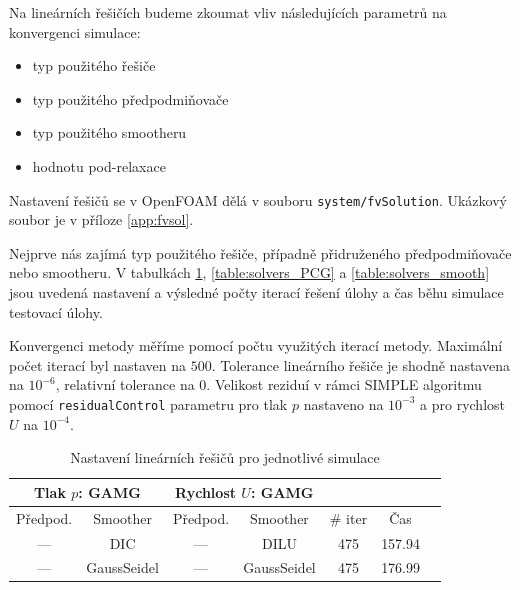 \documentclass[a4paper,12pt]{report}
\theoremstyle{remark}
\begin{document}
Na lineárních řešičích budeme zkoumat vliv následujících parametrů na konvergenci simulace:
 
\begin{itemize}
	\item typ použitého řešiče
	\item typ použitého předpodmiňovače
	\item typ použitého smootheru
	\item hodnotu pod-relaxace
\end{itemize}

Nastavení řešičů se v OpenFOAM dělá v souboru \texttt{system/fvSolution}. Ukázkový soubor je v příloze \ref{app:fvsol}.
	
 Nejprve nás zajímá typ použitého řešiče, případně přidruženého předpodmiňovače nebo smootheru. V tabulkách \ref{table:solvers_GAMG}, \ref{table:solvers_PCG} a \ref{table:solvers_smooth} jsou uvedená nastavení a výsledné počty iterací řešení úlohy a čas běhu simulace testovací úlohy.
 
 Konvergenci metody měříme pomocí počtu využitých iterací metody. Maximální počet iterací byl nastaven na $500$. Tolerance lineárního řešiče je shodně nastavena na $10^{-6}$, relativní tolerance na $0$. Velikost reziduí v rámci SIMPLE algoritmu pomocí \texttt{residualControl} parametru pro tlak $p$ nastaveno na $10^{-3}$ a pro rychlost $U$ na $10^{-4}$.

 \begin{table}[H]
	\centering
	\caption{Nastavení lineárních řešičů pro jednotlivé simulace}
	\renewcommand{\arraystretch}{1.9}
	\begin{tabular}{*7c}
		\toprule
		\multicolumn{2}{c}{Tlak $p$: \textbf{GAMG}} & \multicolumn{2}{c}{Rychlost $U$: \textbf{GAMG}}\\		
		\midrule
		Předpod.&Smoother&Předpod.&Smoother&\# iter&Čas\\
		\midrule
 --- & DIC & --- &  DILU & 475 &157.94\\		
 --- & GaussSeidel &  --- & GaussSeidel & 475&176.99\\
		
			\bottomrule
\end{tabular}

\label{table:solvers_GAMG}

\end{table}
\end{document}
